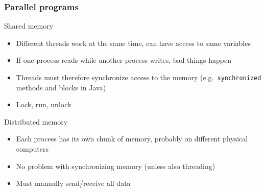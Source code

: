 \documentclass[usenames,dvipsnames,mathserif,compress]{beamer}
\begin{document}

\begin{frame}
  \frametitle{Parallel programs}
  \begin{block}{Shared memory}
    \begin{itemize}
    \item Different threads work at the same time, can have access to same variables
    \item If one process reads while another process writes, bad things happen
    \item Threads must therefore \alert{synchronize} access to the memory
      (e.g.~\texttt{synchronized} methods and blocks in Java)
    \item Lock, run, unlock
    \end{itemize}
  \end{block}
  \begin{block}{Distributed memory}
    \begin{itemize}
    \item Each process has its own chunk of memory, probably on different physical computers
    \item No problem with synchronizing memory (unless also threading)
    \item Must manually send/receive all data
    \end{itemize}
  \end{block}
\end{frame}
\end{document}
